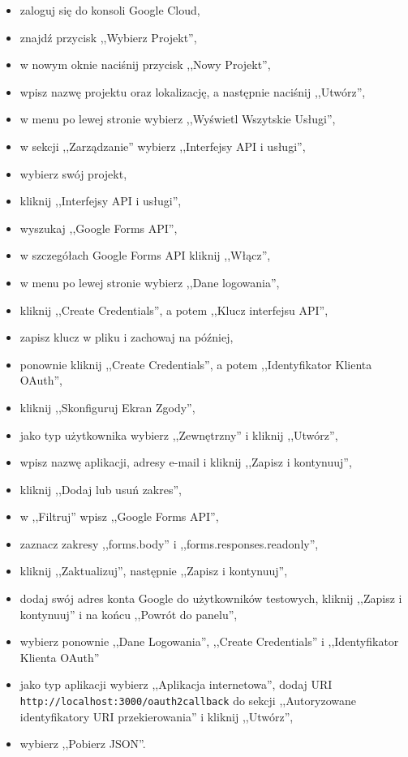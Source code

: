 \begin{itemize}
  \item zaloguj się do konsoli Google Cloud,
  \item znajdź przycisk ,,Wybierz Projekt'',
  \item w nowym oknie naciśnij przycisk ,,Nowy Projekt'',
  \item wpisz nazwę projektu oraz lokalizację, a następnie naciśnij ,,Utwórz'',
  \item w menu po lewej stronie wybierz ,,Wyświetl Wszytskie Usługi'',
  \item w sekcji ,,Zarządzanie'' wybierz ,,Interfejsy API i usługi'',
  \item wybierz swój projekt,
  \item kliknij ,,Interfejsy API i usługi'',
  \item wyszukaj ,,Google Forms API'',
  \item w szczegółach Google Forms API kliknij ,,Włącz'',
  \item w menu po lewej stronie wybierz ,,Dane logowania'',
  \item kliknij ,,Create Credentials'', a potem ,,Klucz interfejsu API'',
  \item zapisz klucz w pliku i zachowaj na później,
  \item ponownie kliknij ,,Create Credentials'', a potem 
  ,,Identyfikator Klienta OAuth'',
  \item kliknij ,,Skonfiguruj Ekran Zgody'',
  \item jako typ użytkownika wybierz ,,Zewnętrzny'' i kliknij ,,Utwórz'',
  \item wpisz nazwę aplikacji, adresy e-mail i kliknij ,,Zapisz i kontynuuj'',
  \item kliknij ,,Dodaj lub usuń zakres'',
  \item w ,,Filtruj'' wpisz ,,Google Forms API'',
  \item zaznacz zakresy ,,forms.body'' i ,,forms.responses.readonly'',
  \item kliknij ,,Zaktualizuj'', następnie ,,Zapisz i kontynuuj'',
  \item dodaj swój adres konta Google do użytkowników testowych, kliknij
  ,,Zapisz i kontynuuj'' i na końcu ,,Powrót do panelu'',
  \item wybierz ponownie ,,Dane Logowania'', ,,Create Credentials''
  i ,,Identyfikator Klienta OAuth''
  \item jako typ aplikacji wybierz ,,Aplikacja internetowa'', dodaj URI 
  \\ \texttt{http://localhost:3000/oauth2callback} do sekcji ,,Autoryzowane 
  identyfikatory URI przekierowania'' i kliknij ,,Utwórz'',
  \item wybierz ,,Pobierz JSON''.
\end{itemize}

